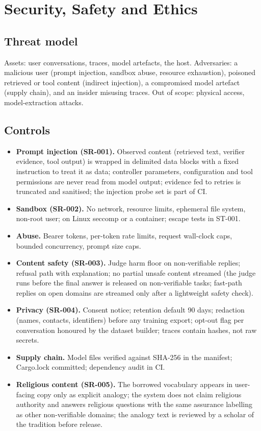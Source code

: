 \documentclass[11pt,a4paper]{article}
\begin{document}
\section{Security, Safety and Ethics}
\label{sec:security}
\subsection{Threat model}
Assets: user conversations, traces, model artefacts, the host. Adversaries: a malicious user (prompt injection, sandbox abuse, resource exhaustion), poisoned retrieved or tool content (indirect injection), a compromised model artefact (supply chain), and an insider misusing traces. Out of scope: physical access, model-extraction attacks.
\subsection{Controls}
\begin{itemize}
\item \textbf{Prompt injection (SR-001).} Observed content (retrieved text, verifier evidence, tool output) is wrapped in delimited data blocks with a fixed instruction to treat it as data; controller parameters, configuration and tool permissions are never read from model output; evidence fed to retries is truncated and sanitised; the injection probe set is part of CI.
\item \textbf{Sandbox (SR-002).} No network, resource limits, ephemeral file system, non-root user; on Linux seccomp or a container; escape tests in ST-001.
\item \textbf{Abuse.} Bearer tokens, per-token rate limits, request wall-clock caps, bounded concurrency, prompt size caps.
\item \textbf{Content safety (SR-003).} Judge harm floor on non-verifiable replies; refusal path with explanation; no partial unsafe content streamed (the judge runs before the final answer is released on non-verifiable tasks; fast-path replies on open domains are streamed only after a lightweight safety check).
\item \textbf{Privacy (SR-004).} Consent notice; retention default 90 days; redaction (names, contacts, identifiers) before any training export; opt-out flag per conversation honoured by the dataset builder; traces contain hashes, not raw secrets.
\item \textbf{Supply chain.} Model files verified against SHA-256 in the manifest; Cargo.lock committed; dependency audit in CI.
\item \textbf{Religious content (SR-005).} The borrowed vocabulary appears in user-facing copy only as explicit analogy; the system does not claim religious authority and answers religious questions with the same assurance labelling as other non-verifiable domains; the analogy text is reviewed by a scholar of the tradition before release.
\end{itemize}
\end{document}

